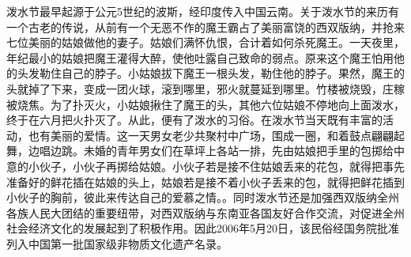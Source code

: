 泼水节最早起源于公元5世纪的波斯，经印度传入中国云南。关于泼水节的来历有一个古老的传说，从前有一个无恶不作的魔王霸占了美丽富饶的西双版纳，并抢来七位美丽的姑娘做他的妻子。姑娘们满怀仇恨，合计着如何杀死魔王。一天夜里，年纪最小的姑娘把魔王灌得大醉，使他吐露自己致命的弱点。原来这个魔王怕用他的头发勒住自己的脖子。小姑娘拔下魔王一根头发，勒住他的脖子。果然，魔王的头就掉了下来，变成一团火球，滚到哪里，邪火就蔓延到哪里。竹楼被烧毁，庄稼被烧焦。为了扑灭火，小姑娘揪住了魔王的头，其他六位姑娘不停地向上面泼水，终于在六月把火扑灭了。从此，便有了泼水的习俗。在泼水节当天既有丰富的活动，也有美丽的爱情。这一天男女老少共聚村中广场，围成一圈，和着鼓点翩翩起舞，边唱边跳。未婚的青年男女们在草坪上各站一排，先由姑娘把手里的包掷给中意的小伙子，小伙子再掷给姑娘。小伙子若是接不住姑娘丢来的花包，就得把事先准备好的鲜花插在姑娘的头上，姑娘若是接不着小伙子丢来的包，就得把鲜花插到小伙子的胸前，彼此来传达自己的爱慕之情。。同时泼水节还是加强西双版纳全州各族人民大团结的重要纽带，对西双版纳与东南亚各国友好合作交流，对促进全州社会经济文化的发展起到了积极作用。因此2006年5月20日，该民俗经国务院批准列入中国第一批国家级非物质文化遗产名录。